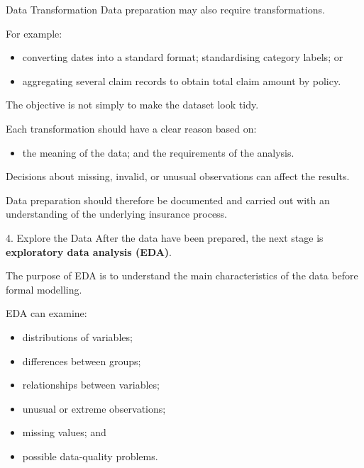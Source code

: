 \documentclass[
  ignorenonframetext,
  aspectratio=169,
]{beamer}
\providecommand{\tightlist}{%
  \setlength{\itemsep}{0pt}\setlength{\parskip}{0pt}}
\begin{document}
\begin{frame}{Data Transformation}
\protect{}\label{data-transformation}
Data preparation may also require transformations.

For example:

\begin{itemize}
\tightlist
\item
  converting dates into a standard format; standardising category
  labels; or
\item
  aggregating several claim records to obtain total claim amount by
  policy.
\end{itemize}

The objective is not simply to make the dataset look tidy.

Each transformation should have a clear reason based on:

\begin{itemize}
\tightlist
\item
  the meaning of the data; and the requirements of the analysis.
\end{itemize}

\begin{tcolorbox}[enhanced jigsaw, arc=.35mm, bottomrule=.15mm, bottomtitle=1mm, breakable, colback=white, colbacktitle=quarto-callout-note-color!10!white, colframe=quarto-callout-note-color-frame, coltitle=black, left=2mm, leftrule=.75mm, opacityback=0, opacitybacktitle=0.6, rightrule=.15mm, title=\textcolor{quarto-callout-note-color}{\faInfo}\hspace{0.5em}{Data cleaning is part of the analysis}, titlerule=0mm, toprule=.15mm, toptitle=1mm]

Decisions about missing, invalid, or unusual observations can affect the
results.

Data preparation should therefore be documented and carried out with an
understanding of the underlying insurance process.

\end{tcolorbox}
\end{frame}

\begin{frame}{4. Explore the Data}
\protect{}\label{explore-the-data}
After the data have been prepared, the next stage is \textbf{exploratory
data analysis (EDA)}.

The purpose of EDA is to understand the main characteristics of the data
before formal modelling.

EDA can examine:

\begin{itemize}
\tightlist
\item
  distributions of variables;
\item
  differences between groups;
\item
  relationships between variables;
\item
  unusual or extreme observations;
\item
  missing values; and
\item
  possible data-quality problems.
\end{itemize}
\end{frame}
\end{document}
